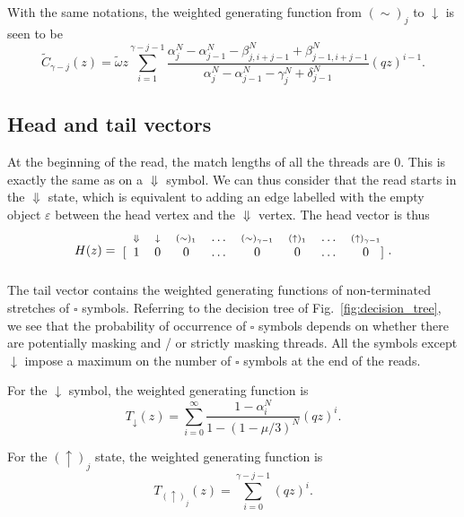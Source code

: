 \documentclass{article}
\newcommand{\DN}{\scriptstyle{\Downarrow}}
\newcommand{\dn}{\scriptstyle{\downarrow}}
\newcommand{\up}[1]{\scriptstyle{(\uparrow)_{#1}}}
\newcommand{\eq}[1]{\scriptstyle{(\sim)_{#1}}}
\begin{document}
With the same notations, the weighted generating function from $(\sim)_j$
to $\downarrow$ is seen to be 
\begin{equation}
\tilde{C}_{\gamma-j}(z) = \tilde{\omega} z \sum_{i=1}^{\gamma-j-1}
\frac{ \alpha_j^N-\alpha_{j-1}^N-\beta_{j,i+j-1}^N
  +\beta_{j-1,i+j-1}^N }
{\alpha_j^N-\alpha_{j-1}^N-\gamma_j^N+\delta_{j-1}^N} (qz)^{i-1}.
\end{equation}

\subsection{Head and tail vectors}

At the beginning of the read, the match lengths of all the threads are
$0$. This is exactly the same as on a $\Downarrow$ symbol. We can thus
consider that the read starts in the $\Downarrow$ state, which is
equivalent to adding an edge labelled with the empty object $\varepsilon$
between the head vertex and the $\Downarrow$ vertex. The head vector is
thus
\begin{equation*}
H(z) = 
\begin{blockarray}{cccccccc}
   \;\; \DN & \dn &\eq{1} & \ldots & \eq{\gamma-1} &
    \up{1} & \ldots & \up{\gamma-1} \\
\begin{block}{[cccccccc]}
\;\; 1 & 0 & 0 & \ldots & 0 & 0 & \ldots & 0 \\
\end{block}
\end{blockarray}.
\end{equation*}
The tail vector contains the weighted generating functions of
non-terminated stretches of $\square$ symbols. Referring to the decision
tree of Fig.~\ref{fig:decision_tree}, we see that the probability of
occurrence of $\square$ symbols depends on whether there are potentially
masking and / or strictly masking threads. All the symbols except
$\downarrow$ impose a maximum on the number of $\square$ symbols at the
end of the reads.

For the $\downarrow$ symbol, the weighted generating function is
\begin{equation}
T_{\downarrow}(z) = \sum_{i=0}^\infty
\frac{1-\alpha_i^N}{1-(1-\mu/3)^N} (qz)^i.
\end{equation}

For the $(\uparrow)_j$ state, the weighted generating function is
\begin{equation}
T_{(\uparrow)_j}(z) = \sum_{i=0}^{\gamma-j-1} (qz)^i.
\end{equation}
\end{document}
